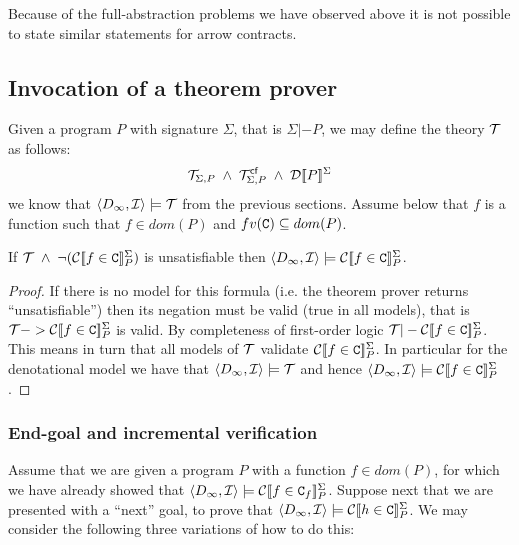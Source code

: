 \documentclass[preprint,nocopyrightspace]{sigplanconf}
\begin{document}
Because of the full-abstraction problems we have observed above it 
is not possible to state similar statements for arrow contracts. 


\subsection{Invocation of a theorem prover}\label{sect:infocation}

Given a program $P$ with signature $\Sigma$, that is $\Sigma |- P$, we may define the theory
${\cal T}$ as follows:
     \[ \Th{\Sigma}{P}\;\land\;\Th{\Sigma}{P}^{\lcfZ}\;\land\;\dtrans{\Sigma}{P} \]
we know that $\langle D_\infty,{\cal I}\rangle \models {\cal T}$ from the previous sections. 
Assume below that $f$ is a function such that $f \in dom(P)$ and $fv(\Ct) \subseteq dom(P)$.

\begin{theorem}[Soundness]\label{thm:prover-soundess}
If ${\cal T}\;\land\;\neg(\ctrans{\Sigma}{P}{f \in \Ct})$ is 
unsatisfiable then $\langle D_\infty,{\cal I}\rangle \models \ctrans{\Sigma}{P}{f \in \Ct}$.
\end{theorem}
\begin{proof}
If there is no model for this formula (i.e. the theorem prover returns ``unsatisfiable'') then
its negation must be valid (true in all models), that 
is ${\cal T} -> \ctrans{\Sigma}{P}{f \in \Ct}$ is valid. By completeness
of first-order logic ${\cal T} |- \ctrans{\Sigma}{P}{f \in \Ct}$. This means in 
turn that all models of ${\cal T}$ validate $\ctrans{\Sigma}{P}{f \in \Ct}$. In particular 
for the denotational model we have that $\langle D_\infty,{\cal I}\rangle \models {\cal T}$ 
and hence $\langle D_\infty,{\cal I}\rangle \models \ctrans{\Sigma}{P}{f \in \Ct}$.
\end{proof}

\subsubsection{End-goal and incremental verification}\label{sect:incremental}

Assume that we are given a program $P$ with a function $f \in dom(P)$, for which we have 
already showed that $\langle D_\infty,{\cal I}\rangle \models \ctrans{\Sigma}{P}{f \in \Ct_f}$. 
Suppose next that we are presented with a ``next'' goal, to prove that 
$\langle D_\infty,{\cal I}\rangle \models \ctrans{\Sigma}{P}{h \in \Ct}$. 
We may consider the following three variations of how to do this:
\end{document}
